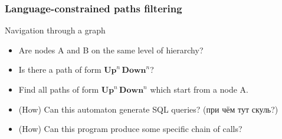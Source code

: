 \documentclass{beamer}
\begin{document}
\begin{frame}[fragile]
  \transwipe[direction=90]
  \frametitle{Language-constrained paths filtering}
  \begin{minipage}[m]{0.45\linewidth}
\end{minipage}\hfill
\begin{minipage}[m]{0.5\linewidth}
Navigation through a graph
\begin{itemize}
      \item Are nodes A and B on the same level of hierarchy?
      \item Is there a path of form $\textbf{Up}^n \, \textbf{Down}^n$?
      \item Find all paths of form $\textbf{Up}^n \, \textbf{Down}^n$ which start from a node A.
\end{itemize}

\end{minipage}

  \begin{itemize}
    \item (How) Can this automaton generate SQL queries? (при чём тут скуль?)
    \item (How) Can this program produce some specific chain of calls? 
  \end{itemize}
\end{frame}
\end{document}
